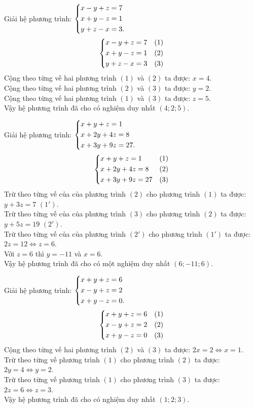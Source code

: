 \begin{ex}%
 Giải hệ phương trình: $\left\{\begin{aligned}& x-y+z=7 \\& x+y-z = 1 \\& y+z-x=3.\end{aligned}\right.$
 \loigiai
  {
  $$\left\{\begin{aligned}& x-y+z=7 & (1) \\& x+y-z = 1 & (2) \\& y+z-x=3 & (3)\end{aligned}\right.$$
  Cộng theo từng vế hai phương trình $(1)$ và $(2)$ ta được: $x = 4$.\\
  Cộng theo từng vế hai phương trình $(2)$ và $(3)$ ta được: $y = 2$.\\
  Cộng theo từng vế hai phương trình $(1)$ và $(3)$ ta được: $z = 5$.\\
  Vậy hệ phương trình đã cho có nghiệm duy nhất $(4;2;5)$.
  }
\end{ex}


\begin{ex}%
 Giải hệ phương trình: $\left\{\begin{aligned}& x+y+z=1 \\& x+2y+4z=8 \\& x+3y+9z=27.\end{aligned}\right.$
 \loigiai
  {
  $$\left\{\begin{aligned}& x+y+z=1 & (1) \\& x+2y+4z=8 & (2) \\& x+3y+9z=27 & (3)\end{aligned}\right.$$
  Trừ theo từng vế của của phương trình $(2)$ cho phương trình $(1)$ ta được: $y+3z=7$ \hfill $(1')$.\\
  Trừ theo từng vế của của phương trình $(3)$ cho phương trình $(2)$ ta được: $y+5z=19$ \hfill $(2')$.\\
  Trừ theo từng vế của của phương trình $(2')$ cho phương trình $(1')$ ta được: $2z=12 \Leftrightarrow z = 6$.\\
  Với $z = 6$ thì $y = -11$ và $x = 6$.\\
  Vậy hệ phương trình đã cho có một nghiệm duy nhất $(6;-11;6)$.
  }
\end{ex}


\begin{ex}%
 Giải hệ phương trình: $\left\{\begin{aligned}& x+y+z=6 \\& x-y+z=2 \\& x+y-z=0.\end{aligned}\right.$
 \loigiai
  {
  $$\left\{\begin{aligned}& x+y+z=6 & (1) \\& x-y+z=2 & (2) \\& x+y-z=0 & (3)\end{aligned}\right.$$
  Cộng theo từng vế hai phương trình $(2)$ và $(3)$ ta được: $2x = 2 \Leftrightarrow x = 1$.\\
  Trừ theo từng vế phương trình $(1)$ cho phương trình $(2)$ ta được: $2y = 4 \Leftrightarrow y = 2$.\\
  Trừ theo từng vế phương trình $(1)$ cho phương trình $(3)$ ta được: $2z = 6 \Leftrightarrow z = 3$.\\
  Vậy hệ phương trình đã cho có nghiệm duy nhất $(1;2;3)$.
  }
\end{ex}


